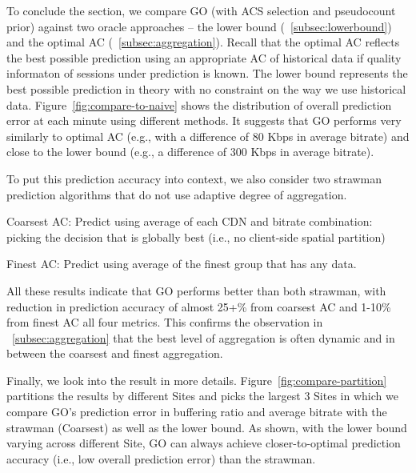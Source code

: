\label{subsec:minieval}

To conclude the section, we compare GO (with ACS selection and pseudocount prior) against two oracle approaches -- the lower bound (\Section~\ref{subsec:lowerbound}) and the optimal AC (\Section~\ref{subsec:aggregation}).  Recall that the optimal AC reflects the best possible prediction using an appropriate AC of historical data if quality informaton of sessions under prediction is known. The lower bound represents the best possible prediction in theory with no constraint on the way we use historical data. Figure~\ref{fig:compare-to-naive} shows the distribution of overall prediction error at each minute using different methods. It suggests that GO performs very similarly to optimal AC (e.g., with a difference of 80 Kbps in average bitrate) and close to the lower bound (e.g., a difference of 300 Kbps in average bitrate). 

To put this prediction accuracy into context, we also consider two strawman prediction algorithms that do not use adaptive degree of aggregation.
\begin{packeditemize}
	\item Coarsest AC: Predict using average of each CDN and bitrate combination: picking the decision that is globally best (i.e., no client-side spatial partition)
	\item Finest AC: Predict using average of the finest group that has any data.
\end{packeditemize}

All these results indicate that GO performs better than both strawman, with reduction in prediction accuracy of almost 25+\% from coarsest AC and 1-10\% from finest AC all four metrics. This confirms the observation in \Section~\ref{subsec:aggregation} that the best level of aggregation is often dynamic and in between the coarsest and finest aggregation.


Finally, we look into the result in more details. Figure~\ref{fig:compare-partition} partitions the results by different Sites and picks the largest 3 Sites in which we compare GO's prediction error in buffering ratio and average bitrate with the strawman (Coarsest) as well as the lower bound. As shown, with the lower bound varying across different Site, GO can always achieve closer-to-optimal prediction accuracy (i.e., low overall prediction error) than the strawman.

